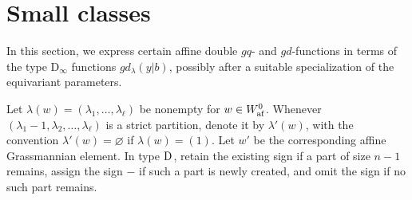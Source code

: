\documentclass[a4paper]{amsart}
\theoremstyle{remark}
\numberwithin{equation}{section}
\begin{document}
\section{Small classes}\label{S: small_cl}

In this section, we express certain affine double $gq$- and $gd$-functions in terms of the type $\mathrm{D}_\infty$ functions $gd_\lambda(y| b)$, possibly after a suitable specialization of the equivariant parameters.

Let $\lambda(w)=(\lambda_1,\dots,\lambda_\ell)$ be nonempty for $w\in W_{\mathrm{af}}^0$. Whenever \((\lambda_1-1,\lambda_2,\ldots,\lambda_\ell)\) is a strict partition, denote it by \(\lambda'(w)\), with the convention \(\lambda'(w)=\varnothing\) if \(\lambda(w)=(1)\). Let \(w'\) be the corresponding affine Grassmannian element. In type \(\mathrm{D}_{}\), retain the existing sign if a part of size \(n-1\) remains, assign the sign \(-\) if such a part is newly created, and omit the sign if no such part remains.



\end{document}
